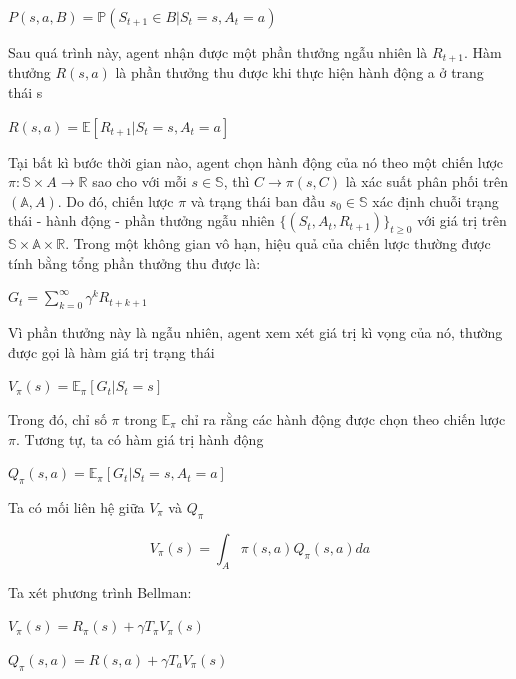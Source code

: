 \documentclass[14pt]{extreport}
\begin{document}
 \begin{center}
 $P(s,a,B)=\mathbb{P} (S_{t+1} \in B|S_t=s,A_t=a)$
 \end{center}
 
 Sau quá trình này, agent nhận được một phần thưởng ngẫu nhiên là $R_{t+1}$. Hàm thưởng $R(s,a)$ là phần thưởng thu được khi thực hiện hành động a ở trang thái s
 
 \begin{center}
 $R(s,a)=\mathbb{E}[R_{t+1}|S_t=s,A_t=a]$
 \end{center}
 
 Tại bất kì bước thời gian nào, agent chọn hành động của nó theo một chiến lược $\pi: \mathbb{S} \times A \rightarrow \mathbb{R}$ sao cho với mỗi $s \in \mathbb{S}$, thì $C \rightarrow \pi(s,C)$ là  xác suất phân phối trên $(\mathbb{A},A)$. Do đó, chiến lược $\pi$ và trạng thái ban đầu $s_0 \in \mathbb{S}$ xác định chuỗi trạng thái - hành động - phần thưởng ngẫu nhiên $\{(S_t,A_t,R_{t+1})\}_{t \geq 0}$ với giá trị trên $\mathbb{S} \times \mathbb{A} \times \mathbb{R}$. Trong một không gian vô hạn, hiệu quả của chiến lược thường được tính bằng tổng phần thưởng thu được là:
 
 \begin{center}
 $G_t=\sum_{k=0}^ {\infty} \gamma ^k R_{t+k+1}$
 \end{center}
 
 Vì phần thưởng này là ngẫu nhiên, agent xem xét giá trị kì vọng của nó, thường được gọi là hàm giá trị trạng thái
 
 \begin{center}
 $V_ \pi (s)=\mathbb{E}_ \pi [G_t|S_t=s]$ 
 \end{center}
 
 Trong đó, chỉ số $\pi$ trong $\mathbb{E}_ \pi$ chỉ ra rằng các hành động được chọn theo chiến lược $\pi$. Tương tự, ta có hàm giá trị hành động
 
 \begin{center}
 $Q_ \pi (s,a)= \mathbb{E}_ \pi [G_t|S_t=s,A_t=a]$
 \end{center}
 
 Ta có mối liên hệ giữa $V_ \pi$ và $Q_ \pi$
 
 
 $$V_ \pi (s)= \int _{A} \pi (s,a) Q_ \pi (s,a) da$$
 
 Ta xét phương trình Bellman:
 
 \begin{center}
 $V_ {\pi} (s)=R_{\pi} (s)+ \gamma T_{\pi}V_{\pi}(s)    $
 
 $Q_{\pi}(s,a) = R(s,a)+ \gamma T_a V_ {\pi}(s) $
 \end{center}
 
\end{document}

